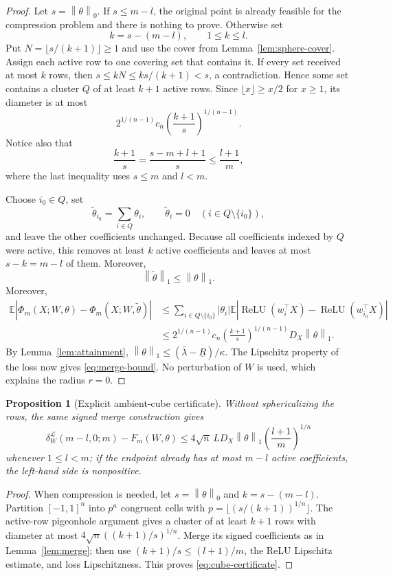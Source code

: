 \documentclass[pdflatex,sn-mathphys-num]{sn-jnl}
\theoremstyle{thmstyleone}
\newtheorem{proposition}[theorem]{Proposition}
\theoremstyle{thmstyletwo}
\theoremstyle{thmstylethree}
\newcommand{\relu}{\operatorname{ReLU}}
\newcommand{\E}{\mathbb{E}}
\newcommand{\norm}[1]{\left\lVert #1 \right\rVert}
\newcommand{\abs}[1]{\left\lvert #1 \right\rvert}
\begin{document}
\begin{proof}
Let $s=\norm{\theta}_0$. If $s\le m-l$, the original point is already feasible for the compression problem and there is nothing to prove. Otherwise set
\[
k=s-(m-l),
\qquad 1\le k\le l.
\]
Put $N=\lfloor s/(k+1)\rfloor\ge1$ and use the cover from Lemma~\ref{lem:sphere-cover}. Assign each active row to one covering set that contains it. If every set received at most $k$ rows, then
$s\le kN\le ks/(k+1)<s$, a contradiction. Hence some set contains a cluster $Q$ of at least $k+1$ active rows. Since $\lfloor x\rfloor\ge x/2$ for $x\ge1$, its diameter is at most
\[
2^{1/(n-1)}c_n
\left(\frac{k+1}{s}\right)^{1/(n-1)}.
\]
Notice also that
\[
\frac{k+1}{s}
=\frac{s-m+l+1}{s}
\le\frac{l+1}{m},
\]
where the last inequality uses $s\le m$ and $l<m$.

Choose $i_0\in Q$, set
\[
\widetilde\theta_{i_0}=\sum_{i\in Q}\theta_i,
\qquad
\widetilde\theta_i=0\quad(i\in Q\setminus\{i_0\}),
\]
and leave the other coefficients unchanged. Because all coefficients indexed by $Q$ were active, this removes at least $k$ active coefficients and leaves at most $s-k=m-l$ of them. Moreover,
\[
\norm{\widetilde\theta}_1\le\norm{\theta}_1.
\]
Moreover,
\begin{align*}
\E\abs{\Phi_m(X;W,\theta)-\Phi_m(X;W,\widetilde\theta)}
&\le
\sum_{i\in Q\setminus\{i_0\}}\abs{\theta_i}
\E\abs{\relu(w_i^\top X)-\relu(w_{i_0}^\top X)}\\
&\le 2^{1/(n-1)}c_n
\left(\frac{k+1}{s}\right)^{1/(n-1)}D_X\norm{\theta}_1.
\end{align*}
By Lemma~\ref{lem:attainment}, $\norm{\theta}_1\le(\bar\lambda-\underline R)/\kappa$. The Lipschitz property of the loss now gives \eqref{eq:merge-bound}. No perturbation of $W$ is used, which explains the radius $r=0$.
\end{proof}

\begin{proposition}[Explicit ambient-cube certificate]\label{prop:cube-merge}
Without sphericalizing the rows, the same signed merge construction gives
\begin{equation}
\delta_W^{\mathcal L}(m-l,0;m)-F_m(W,\theta)
\le
4\sqrt n\,LD_X\norm{\theta}_1
\left(\frac{l+1}{m}\right)^{1/n}
\label{eq:cube-certificate}
\end{equation}
whenever $1\le l<m$; if the endpoint already has at most $m-l$ active coefficients, the left-hand side is nonpositive.
\end{proposition}

\begin{proof}
When compression is needed, let $s=\norm{\theta}_0$ and $k=s-(m-l)$. Partition $[-1,1]^n$ into $p^n$ congruent cells with
$p=\lfloor(s/(k+1))^{1/n}\rfloor$. The active-row pigeonhole argument gives a cluster of at least $k+1$ rows with diameter at most
$4\sqrt n((k+1)/s)^{1/n}$. Merge its signed coefficients as in Lemma~\ref{lem:merge}; then use
$(k+1)/s\le(l+1)/m$, the ReLU Lipschitz estimate, and loss Lipschitzness. This proves \eqref{eq:cube-certificate}.
\end{proof}
\end{document}

